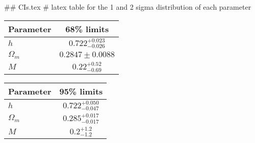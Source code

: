 ## CIs.tex
# latex table for the 1 and 2 sigma distribution of each parameter

\begin{tabular} { l  c}
 Parameter &  68\% limits\\
\hline
{\boldmath$h              $} & $0.722^{+0.023}_{-0.026}   $\\
{\boldmath$\Omega_m       $} & $0.2847\pm 0.0088          $\\
{\boldmath$M              $} & $0.22^{+0.52}_{-0.69}      $\\
\hline
\end{tabular}

\begin{tabular} { l  c}
 Parameter &  95\% limits\\
\hline
{\boldmath$h              $} & $0.722^{+0.050}_{-0.047}   $\\
{\boldmath$\Omega_m       $} & $0.285^{+0.017}_{-0.017}   $\\
{\boldmath$M              $} & $0.2^{+1.2}_{-1.2}         $\\
\hline
\end{tabular}
